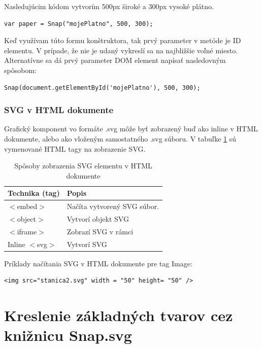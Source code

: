 Nasledujúcim kódom vytvorím 500px široké a 300px vysoké plátno.

\begin{lstlisting}
var paper = Snap("mojePlatno", 500, 300);
\end{lstlisting}

Keď využívam túto formu konštruktora, tak prvý parameter v metóde je ID elementu. V prípade, že nie je udaný vykreslí sa na najbližšie voľné miesto. Alternatívne sa dá prvý parameter DOM element napísať nasledovným spôsobom: 
\begin{lstlisting}
Snap(document.getElementById('mojePlatno'), 500, 300);
\end{lstlisting}



\subsubsection{\acs*{SVG} v HTML dokumente}

Grafický komponent vo formáte .svg môže byť zobrazený buď ako inline v HTML dokumente, alebo ako vloženým samostatného .svg súboru. 
V tabuľke \ref{vytvorenie:SVG} sú vymenované HTML tagy na zobrazenie SVG. 


\begin{table}[H]
	\begin{center}
		\begin{tabular}{|l|l|}
			\hline \textbf{Technika (tag)} & \textbf{Popis} \\ 
		
			\hline $<$embed$>$ & Načíta vytvorený SVG súbor.  \\ 
			\hline $<$object$>$ & Vytvorí objekt SVG  \\ 
			\hline $<$iframe$>$ & Zobrazí SVG v rámci  \\ 
			\hline Inline $<$svg$>$ & Vytvorí SVG   \\ 
			\hline 
		\end{tabular} 
	\end{center}
	\caption{Spôsoby zobrazenia SVG elementu v HTML dokumente}
	\label{vytvorenie:SVG}
\end{table}


Príklady načítania SVG v HTML dokumente pre tag Image:
\begin{lstlisting}
<img src="stanica2.svg" width = "50" height= "50" />
\end{lstlisting}


\section{Kreslenie základných tvarov cez knižnicu Snap.svg}

